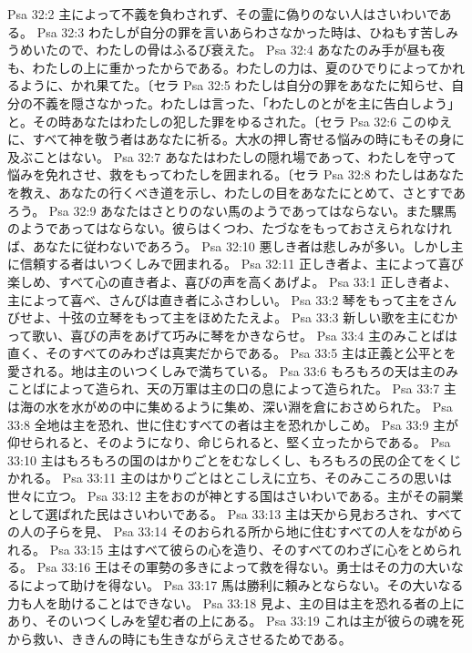 Psa 32:2  主によって不義を負わされず、その霊に偽りのない人はさいわいである。
Psa 32:3  わたしが自分の罪を言いあらわさなかった時は、ひねもす苦しみうめいたので、わたしの骨はふるび衰えた。
Psa 32:4  あなたのみ手が昼も夜も、わたしの上に重かったからである。わたしの力は、夏のひでりによってかれるように、かれ果てた。〔セラ
Psa 32:5  わたしは自分の罪をあなたに知らせ、自分の不義を隠さなかった。わたしは言った、「わたしのとがを主に告白しよう」と。その時あなたはわたしの犯した罪をゆるされた。〔セラ
Psa 32:6  このゆえに、すべて神を敬う者はあなたに祈る。大水の押し寄せる悩みの時にもその身に及ぶことはない。
Psa 32:7  あなたはわたしの隠れ場であって、わたしを守って悩みを免れさせ、救をもってわたしを囲まれる。〔セラ
Psa 32:8  わたしはあなたを教え、あなたの行くべき道を示し、わたしの目をあなたにとめて、さとすであろう。
Psa 32:9  あなたはさとりのない馬のようであってはならない。また騾馬のようであってはならない。彼らはくつわ、たづなをもっておさえられなければ、あなたに従わないであろう。
Psa 32:10  悪しき者は悲しみが多い。しかし主に信頼する者はいつくしみで囲まれる。
Psa 32:11  正しき者よ、主によって喜び楽しめ、すべて心の直き者よ、喜びの声を高くあげよ。
Psa 33:1  正しき者よ、主によって喜べ、さんびは直き者にふさわしい。
Psa 33:2  琴をもって主をさんびせよ、十弦の立琴をもって主をほめたたえよ。
Psa 33:3  新しい歌を主にむかって歌い、喜びの声をあげて巧みに琴をかきならせ。
Psa 33:4  主のみことばは直く、そのすべてのみわざは真実だからである。
Psa 33:5  主は正義と公平とを愛される。地は主のいつくしみで満ちている。
Psa 33:6  もろもろの天は主のみことばによって造られ、天の万軍は主の口の息によって造られた。
Psa 33:7  主は海の水を水がめの中に集めるように集め、深い淵を倉におさめられた。
Psa 33:8  全地は主を恐れ、世に住むすべての者は主を恐れかしこめ。
Psa 33:9  主が仰せられると、そのようになり、命じられると、堅く立ったからである。
Psa 33:10  主はもろもろの国のはかりごとをむなしくし、もろもろの民の企てをくじかれる。
Psa 33:11  主のはかりごとはとこしえに立ち、そのみこころの思いは世々に立つ。
Psa 33:12  主をおのが神とする国はさいわいである。主がその嗣業として選ばれた民はさいわいである。
Psa 33:13  主は天から見おろされ、すべての人の子らを見、
Psa 33:14  そのおられる所から地に住むすべての人をながめられる。
Psa 33:15  主はすべて彼らの心を造り、そのすべてのわざに心をとめられる。
Psa 33:16  王はその軍勢の多きによって救を得ない。勇士はその力の大いなるによって助けを得ない。
Psa 33:17  馬は勝利に頼みとならない。その大いなる力も人を助けることはできない。
Psa 33:18  見よ、主の目は主を恐れる者の上にあり、そのいつくしみを望む者の上にある。
Psa 33:19  これは主が彼らの魂を死から救い、ききんの時にも生きながらえさせるためである。
